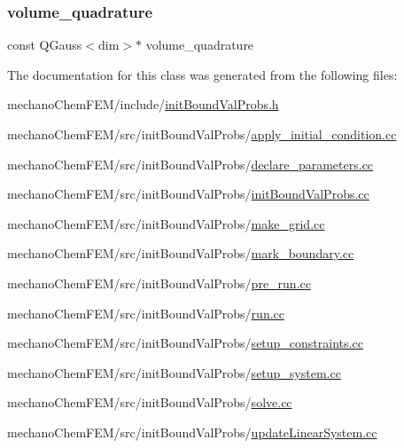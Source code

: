 \mbox{\label{classinit_bound_val_probs_a7e2363a91f6f1626f463f3a06108c03b}} 
\subsubsection{\texorpdfstring{volume\_quadrature}{volume\_quadrature}}
{\footnotesize\ttfamily const Q\+Gauss$<$dim$>$$\ast$ volume\+\_\+quadrature}



The documentation for this class was generated from the following files\+:\begin{DoxyCompactItemize}
\item 
mechano\+Chem\+F\+E\+M/include/\mbox{\hyperlink{init_bound_val_probs_8h}{init\+Bound\+Val\+Probs.\+h}}\item 
mechano\+Chem\+F\+E\+M/src/init\+Bound\+Val\+Probs/\mbox{\hyperlink{apply__initial__condition_8cc}{apply\+\_\+initial\+\_\+condition.\+cc}}\item 
mechano\+Chem\+F\+E\+M/src/init\+Bound\+Val\+Probs/\mbox{\hyperlink{init_bound_val_probs_2declare__parameters_8cc}{declare\+\_\+parameters.\+cc}}\item 
mechano\+Chem\+F\+E\+M/src/init\+Bound\+Val\+Probs/\mbox{\hyperlink{init_bound_val_probs_8cc}{init\+Bound\+Val\+Probs.\+cc}}\item 
mechano\+Chem\+F\+E\+M/src/init\+Bound\+Val\+Probs/\mbox{\hyperlink{make__grid_8cc}{make\+\_\+grid.\+cc}}\item 
mechano\+Chem\+F\+E\+M/src/init\+Bound\+Val\+Probs/\mbox{\hyperlink{mark__boundary_8cc}{mark\+\_\+boundary.\+cc}}\item 
mechano\+Chem\+F\+E\+M/src/init\+Bound\+Val\+Probs/\mbox{\hyperlink{pre__run_8cc}{pre\+\_\+run.\+cc}}\item 
mechano\+Chem\+F\+E\+M/src/init\+Bound\+Val\+Probs/\mbox{\hyperlink{run_8cc}{run.\+cc}}\item 
mechano\+Chem\+F\+E\+M/src/init\+Bound\+Val\+Probs/\mbox{\hyperlink{setup__constraints_8cc}{setup\+\_\+constraints.\+cc}}\item 
mechano\+Chem\+F\+E\+M/src/init\+Bound\+Val\+Probs/\mbox{\hyperlink{setup__system_8cc}{setup\+\_\+system.\+cc}}\item 
mechano\+Chem\+F\+E\+M/src/init\+Bound\+Val\+Probs/\mbox{\hyperlink{solve_8cc}{solve.\+cc}}\item 
mechano\+Chem\+F\+E\+M/src/init\+Bound\+Val\+Probs/\mbox{\hyperlink{update_linear_system_8cc}{update\+Linear\+System.\+cc}}\end{DoxyCompactItemize}
